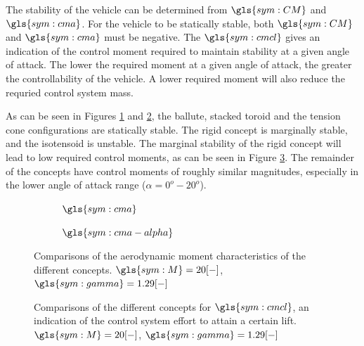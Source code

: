 The stability of the vehicle can be determined from $\gls{sym:CM}$ and $\gls{sym:cma}$. For the vehicle to be statically stable, both $\gls{sym:CM}$ and $\gls{sym:cma}$ must be negative. The $\gls{sym:cmcl}$ gives an indication of the control moment required to maintain stability at a given angle of attack. The lower the required moment at a given angle of attack, the greater the controllability of the vehicle. A lower required moment will also reduce the requried control system mass. 
 
As can be seen in Figures \ref{fig:cm} and \ref{fig:cmalpha}, the ballute, stacked toroid and the tension cone configurations are statically stable. The rigid concept is marginally stable, and the isotensoid is unstable. The marginal stability of the rigid concept will lead to low required control moments, as can be seen in Figure \ref{fig:cmplots}. The remainder of the concepts have control moments of roughly similar magnitudes, especially in the lower angle of attack range ($\alpha = 0^{o}-20^{o}$).  
 
\begin{figure}[h]
	\centering
	\begin{subfigure}[b]{0.49\textwidth}

		\setlength{} 
		\setlength{}
				

		\caption{$\gls{sym:cma}$}
		\label{fig:cm}
	\end{subfigure}
	\begin{subfigure}[b]{0.49\textwidth}

		\setlength{} 
		\setlength{}
				

		\caption{$\gls{sym:cma-alpha}$}
		\label{fig:cmalpha}
	\end{subfigure}
	\caption{Comparisons of the aerodynamic moment characteristics of the different concepts. $\gls{sym:M}=20[-]$, $\gls{sym:gamma}=1.29[-]$}
	\label{fig:cmplots}
\end{figure}


\begin{figure}[h]
	\centering
	\setlength{} 
	\setlength{}
		
	\caption{Comparisons of the different concepts for $\gls{sym:cmcl}$, an indication of the control system effort to attain a certain lift. $\gls{sym:M}=20[-]$, $\gls{sym:gamma}=1.29[-]$}
	\label{fig:cmcl}
\end{figure}

